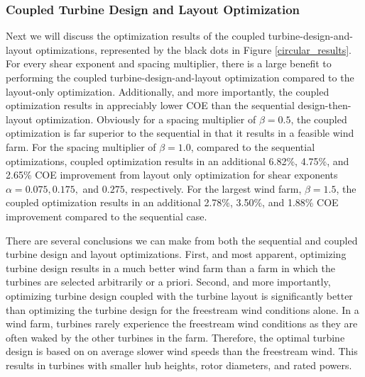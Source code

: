 \subsubsection{Coupled Turbine Design and Layout Optimization}
Next we will discuss the optimization results of the coupled turbine-design-and-layout optimizations, represented by the black dots in Figure \ref{circular_results}. For every shear exponent and spacing multiplier, there is a large benefit to performing the coupled turbine-design-and-layout optimization compared to the layout-only optimization. Additionally, and more importantly, the coupled optimization results in appreciably lower COE than the sequential design-then-layout optimization. Obviously for a spacing multiplier of $\beta=0.5$, the coupled optimization is far superior to the sequential in that it results in a feasible wind farm. For the spacing multiplier of $\beta=1.0$, 
compared to the sequential optimizations, coupled optimization results in an additional 6.82\%, 4.75\%, and 2.65\% COE improvement from layout only optimization for shear exponents $\alpha=0.075, 0.175,$ and $0.275$, respectively. For the largest wind farm, $\beta=1.5$, the coupled optimization results in an additional 2.78\%, 3.50\%, and 1.88\% COE improvement compared to the sequential case. 

There are several conclusions we can make from both the sequential and coupled turbine design and layout optimizations. First, and most apparent, optimizing turbine design results in a much better wind farm than a farm in which the turbines are selected arbitrarily or a priori. Second, and more importantly, optimizing turbine design coupled with the turbine layout is significantly better than optimizing the turbine design for the freestream wind conditions alone. In a wind farm, turbines rarely experience the freestream wind conditions as they are often waked by the other turbines in the farm. Therefore, the optimal turbine design is based on on average slower wind speeds than the freestream wind. This results in turbines with smaller hub heights, rotor diameters, and rated powers. 

